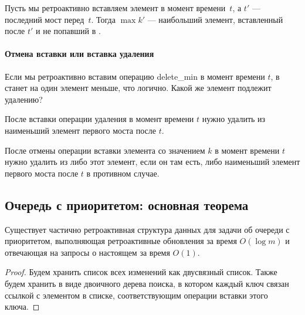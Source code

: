 \begin{stat}
	Пусть мы ретроактивно вставляем элемент в момент времени~$t$, а $t'$ — последний мост перед~$t$. Тогда $\max k'$ — наибольший элемент, вставленный после $t'$ и не попавший в \qnow.
\end{stat} \vspace{-4mm}

\paragraph{Отмена вставки или вставка удаления} Если мы ретроактивно вставим операцию delete\_min в момент времени $t$, в \qnow станет на один элемент меньше, что логично. Какой же элемент подлежит удалению?

\begin{stat}
	После вставки операции удаления в момент времени $t$ нужно удалить из \qnow наименьший элемент первого моста после $t$.

	После отмены операции вставки элемента со значением $k$ в момент времени $t$ нужно удалить из \qnow либо этот элемент, если он там есть, либо наименьший элемент первого моста после $t$ в противном случае.
\end{stat}

\subsection{Очередь с приоритетом: основная теорема}

\begin{theorem} 
	Существует частично ретроактивная структура данных для задачи об очереди с приоритетом, выполняющая ретроактивные обновления за время $O(\log m)$ и отвечающая на запросы о настоящем за время $O(1)$.
\end{theorem}

\begin{proof}
	Будем хранить список всех изменений как двусвязный список. Также будем хранить \qnow в виде двоичного дерева поиска, в котором каждый ключ связан ссылкой с элементом в списке, соответствующим операции вставки этого ключа.

\end{proof}